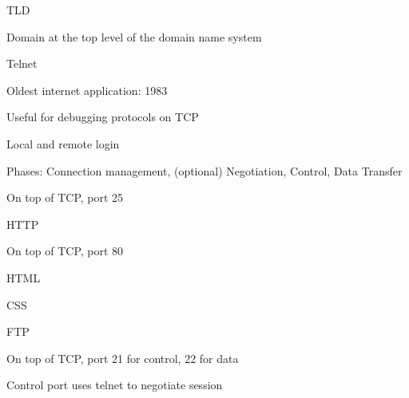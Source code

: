 \documentclass[main.tex]{subfiles}
\begin{document}
\small


\begin{card}{TLD}
\item Domain at the top level of the domain name system
\end{card}

\begin{card}{Telnet}
\item Oldest internet application: 1983
\item Useful for debugging protocols on TCP
\item Local and remote login
\item Phases: Connection management, (optional) Negotiation, Control, Data Transfer
\item On top of TCP, port 25
\end{card}


\begin{card}{HTTP}
\item On top of TCP, port 80
\end{card}

 
\begin{card}{HTML}
\TODO
\end{card}


\begin{card}{CSS}
\TODO
\end{card}



\begin{card}{FTP}
\item On top of TCP, port 21 for control, 22 for data
\item Control port uses telnet to negotiate session
\end{card}
\end{document}
